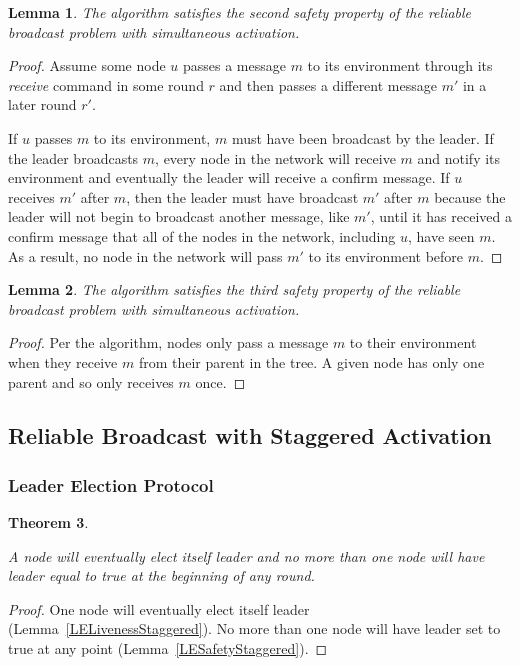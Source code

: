\documentclass[english]{article}
\newtheorem{theorem}{Theorem}[section]
\newtheorem{lemma}[theorem]{Lemma}
\begin{document}
\begin{lemma}
\label{StaticRBSafety2}
The algorithm satisfies the second safety property of the reliable broadcast problem with simultaneous activation.
\end{lemma}
\begin{proof}

Assume some node $u$ passes a message $m$ to its environment through its \textit{receive} command in some round $r$ and then passes a different message $m'$ in a later round $r'$. 

If $u$ passes $m$ to its environment, $m$ must have been broadcast by the leader. If the leader broadcasts $m$, every node in the network will receive $m$ and notify its environment and eventually the leader will receive a confirm message. If $u$ receives $m'$ after $m$, then the leader must have broadcast $m'$ after $m$ because the leader will not begin to broadcast another message, like $m'$, until it has received a confirm message that all of the nodes in the network, including $u$, have seen $m$. As a result, no node in the network will pass $m'$ to its environment before $m$.

\end{proof}

\begin{lemma}
\label{StaticRBSafety3}
  The algorithm satisfies the third safety property of the reliable broadcast problem with simultaneous activation.
\end{lemma}
\begin{proof}

Per the algorithm, nodes only pass a message $m$ to their environment when they receive $m$ from their parent in the tree. A given node has only one parent and so only receives $m$ once.

\end{proof}



\subsection {Reliable Broadcast with Staggered Activation}

\subsubsection{Leader Election Protocol}

\begin{theorem}
\label{LeaderElectionStaggered}

A node will eventually elect itself leader and no more than one node will have leader equal to true at the beginning of any round. 
\end{theorem}
\begin{proof}
One node will eventually elect itself leader (Lemma~\ref{LELivenessStaggered}).
No more than one node will have leader set to true at any point (Lemma~\ref{LESafetyStaggered}).
\end{proof}
\end{document}
